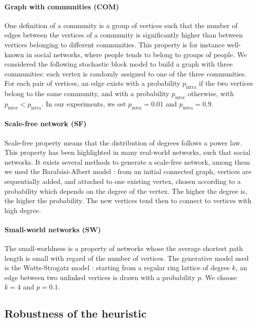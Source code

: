 \documentclass{scrartcl}
\theoremstyle{plain}
\begin{document}
\paragraph{Graph with communities (COM)}
One definition of a community is a group of vertices such that the number of 
edges between the vertices of a community is significantly higher than between 
vertices belonging to different communities. This property is for instance 
well-known in social networks, where people tends to belong to groups of people. 
We considered the following stochastic block model to build a graph with three 
communities: each vertex is randomly assigned to one of the three communities. 
For each pair of vertices, an edge exists with a probability $p_{\text{intra}}$ 
if the two vertices belong to the same community, and with a probability 
$p_{\text{inter}}$ otherwise, with $p_{\text{inter}} < p_{\text{intra}}$. In our 
experiments, we set $p_{\text{inter}} = 0.01$ and $p_{\text{intra}} = 0.9$.

\paragraph{Scale-free network (SF)} 
Scale-free property means that the distribution of degrees follows a power law. 
This property has been highlighted in many real-world networks, such that social 
networks. It exists several methods to generate a scale-free network, among them 
we used the Barab\'asi-Albert model \cite{Albert2002}: from an initial connected 
graph, vertices are sequentially added, and attached to one existing vertex, 
chosen according to a probability which depends on the degree of the vertex. The 
higher the degree is, the higher the probability. The new vertices tend then to 
connect to vertices with high degree.

\paragraph{Small-world networks (SW)} 
The small-worldness is a property of networks whose the average shortest path 
length is small with regard of the number of vertices. The generative model used 
is the Watts-Strogatz model \cite{Watts1998}: starting from a regular ring 
lattice of degree $k$, an edge between two unlinked vertices is drawn with a 
probability $p$. We choose $k=4$ and $p=0.1$.


\subsection{Robustness of the heuristic}
\end{document}
